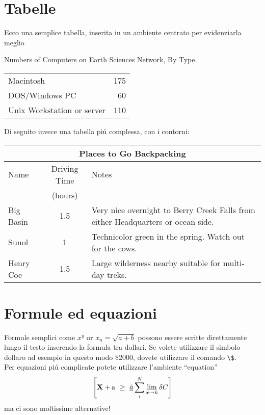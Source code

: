 \documentclass[12pt]{article}
\begin{document}
\section{Tabelle}


Ecco una semplice tabella, inserita in un ambiente centrato per evidenziarla meglio

\begin{center}
Numbers of Computers on Earth Sciences Network, By Type.

\begin{tabular}{lr}
Macintosh&175\\
DOS/Windows PC&60\\
Unix Workstation or server&110\\
\end{tabular}
\end{center}


Di seguito invece una tabella pi\'u complessa, con i contorni:
\begin{center}
\begin{tabular}{|l|c|p{3.5in}|}
\hline
\multicolumn{3}{|c|}{Places to Go Backpacking}\\ \hline
Name&Driving Time&Notes\\
&(hours)&\\ \hline
Big Basin&1.5&Very nice overnight to Berry Creek Falls from
either Headquarters or ocean side.\\ \hline
Sunol&1&Technicolor green in the spring. Watch out for the cows.\\ \hline
Henry Coe&1.5&Large wilderness nearby suitable for multi-day treks.\\ \hline
\end{tabular}
\end{center}

\section{Formule ed equazioni}

Formule semplici come $x^y$ or $x_n = \sqrt{a + b}$ possono essere scritte direttamente lungo il testo inserendo la formula tra dollari.
Se volete utilizzare il simbolo dollaro ad esempio in questo modo \$2000,
dovete utilizzare il comando \verb+\$+.
\\

Per equazioni pi\'u complicate potete utilizzare l'ambiente  ``equation'' 
\begin{equation}
\left[
{\bf X} + {\rm a} \ \geq\ 
\underline{\hat a} \sum_i^N \lim_{x \rightarrow k} \delta C
\right]
\end{equation}
ma ci sono moltissime alternative!
\end{document}
